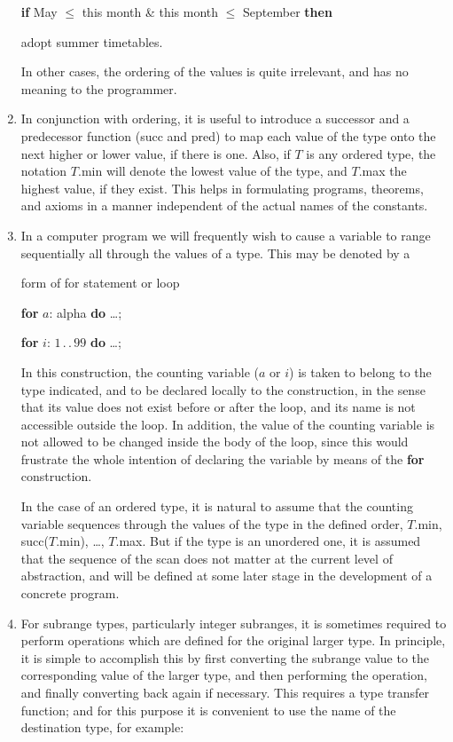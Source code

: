 \begin{enumerate}[wide, nosep, label=(\arabic*)]
	\quad \textbf{if} May $\leqslant$ this month \& this month $\leqslant$ September \textbf{then}
	
	\qquad adopt summer timetables. 
	
	\noindent
	In other cases, the ordering of the values is quite irrelevant, and has no meaning to the programmer.
	
	\item In conjunction with ordering, it is useful to introduce a successor and a predecessor function (succ and pred) to map each value of the type onto the next higher or lower value, if there is one. Also, if $T$ is any ordered type, the notation $T$.min will denote the lowest value of the type, and $T$.max the highest value, if they exist. This helps in formulating programs, theorems, and axioms in a manner independent of the actual names of the constants.
	\item In a computer program we will frequently wish to cause a variable to range sequentially all through the values of a type. This may be denoted by a
	
	form of for statement or loop
	
	\quad \textbf{for} $a$: alpha \textbf{do} \dots;
	
	\quad \textbf{for} $i$: $1\,.\,.\,99$ \textbf{do} \dots;
	
	\noindent
	In this construction, the counting variable ($a$ or $i$) is taken to belong to the type indicated, and to be declared locally to the construction, in the sense that its value does not exist before or after the loop, and its name is not accessible outside the loop. In addition, the value of the counting variable is not allowed to be changed inside the body of the loop, since this would frustrate the whole intention of declaring the variable by means of the \textbf{for} construction.
	
	In the case of an ordered type, it is natural to assume that the counting variable sequences through the values of the type in the defined order, $T.$min, succ($T.$min), \dots, $T.$max. But if the type is an unordered one, it is assumed that the sequence of the scan does not matter at the current level of abstraction, and will be defined at some later stage in the development of a concrete program.
	
	\item For subrange types, particularly integer subranges, it is sometimes required to perform operations which are defined for the original larger type. In principle, it is simple to accomplish this by first converting the subrange value to the corresponding value of the larger type, and then performing the operation, and finally converting back again if necessary. This requires a type transfer function; and for this purpose it is convenient to use the name of the destination type, for example:
	

\end{enumerate}
